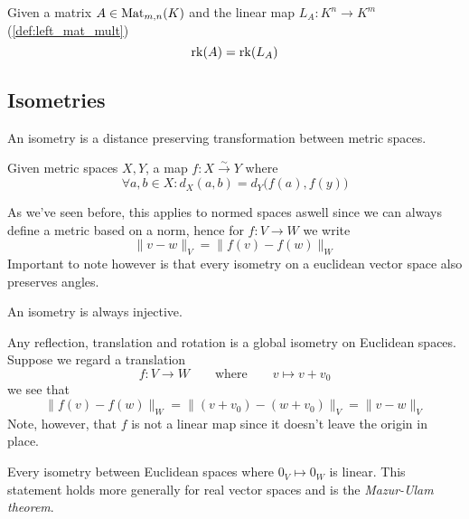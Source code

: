 \begin{theorem}[\(\rk(A) = \rk(L_A)\)]
   Given a matrix \(A \in \operatorname{Mat}_{m,n}(K)\) and the linear map \(L_{A}: K^n \to K^m\) (\ref{def:left_mat_mult})
   \[\operatorname{rk}(A) = \operatorname{rk}(L_A)\]
\end{theorem}

\subsection{Isometries}
An isometry is a distance preserving transformation between metric spaces.
\begin{definition}[Isometry]
   Given metric spaces \(X, Y\), a map \(f: X \xrightarrow{\sim} Y\) where
   \[\forall a, b \in X: d_X(a, b) = d_Y\big(f(a), f(y)\big)\]
\end{definition}
\begin{remark}
   As we've seen before, this applies to normed spaces aswell since we can always define a metric based on a norm, hence for \(f: V \to W\) we write
   \[\|v - w\|_V = \|f(v) - f(w)\|_W\]
   Important to note however is that every isometry on a euclidean vector space also preserves angles.
\end{remark}
\begin{remark}
   An isometry is always injective.
\end{remark}
\begin{example}
   Any reflection, translation and rotation is a global isometry on Euclidean spaces.
   Suppose we regard a translation
   \[f: V \to W \qquad\text{where}\qquad v \mapsto v + v_0\]
   we see that
   \[\|f(v) - f(w)\|_W = \|(v + v_0) - (w + v_0)\|_V = \|v - w\|_V\]
   Note, however, that \(f\) is not a linear map since it doesn't leave the origin in place.
\end{example}

Every isometry between Euclidean spaces where \(0_V \mapsto 0_W\) is linear.
This statement holds more generally for real vector spaces and is the \emph{Mazur-Ulam theorem}.

